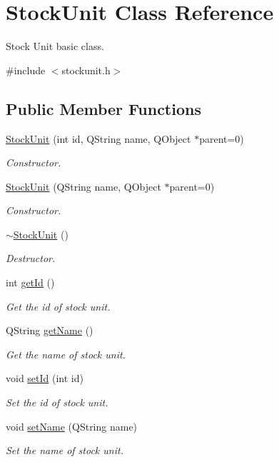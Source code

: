 \hypertarget{class_stock_unit}{\section{\-Stock\-Unit \-Class \-Reference}
\label{class_stock_unit}
}


\-Stock \-Unit basic class.  




{\ttfamily \#include $<$stockunit.\-h$>$}

\subsection*{\-Public \-Member \-Functions}
\begin{DoxyCompactItemize}
\item 
\hyperlink{class_stock_unit_ad526d86dc0231709ba74486ad57a7c1e}{\-Stock\-Unit} (int id, \-Q\-String name, \-Q\-Object $\ast$parent=0)
\begin{DoxyCompactList}\small\item\em \-Constructor. \end{DoxyCompactList}\item 
\hyperlink{class_stock_unit_affc4da6f73b69a587b6677e65fb249a3}{\-Stock\-Unit} (\-Q\-String name, \-Q\-Object $\ast$parent=0)
\begin{DoxyCompactList}\small\item\em \-Constructor. \end{DoxyCompactList}\item 
\hyperlink{class_stock_unit_a8da9559bc7601b1954cd34b2c348bf51}{$\sim$\-Stock\-Unit} ()
\begin{DoxyCompactList}\small\item\em \-Destructor. \end{DoxyCompactList}\item 
int \hyperlink{class_stock_unit_ac195b7a3e39010897457f4e2cf7c2dd5}{get\-Id} ()
\begin{DoxyCompactList}\small\item\em \-Get the id of stock unit. \end{DoxyCompactList}\item 
\-Q\-String \hyperlink{class_stock_unit_ad7f3194b7eaf4b969da8c2a5ccc04d90}{get\-Name} ()
\begin{DoxyCompactList}\small\item\em \-Get the name of stock unit. \end{DoxyCompactList}\item 
void \hyperlink{class_stock_unit_add354be10cd0baa2083ed5fdf67b72e1}{set\-Id} (int id)
\begin{DoxyCompactList}\small\item\em \-Set the id of stock unit. \end{DoxyCompactList}\item 
void \hyperlink{class_stock_unit_a97fb54adf2c06e11e14187ee71035810}{set\-Name} (\-Q\-String name)
\begin{DoxyCompactList}\small\item\em \-Set the name of stock unit. \end{DoxyCompactList}\end{DoxyCompactItemize}


